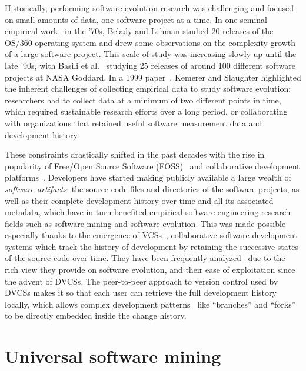 Historically, performing software evolution research was challenging and
focused on small amounts of data, one software project at a time. In one
seminal empirical work~\cite{belady1976model} in the '70s, Belady and Lehman
studied 20 releases of the OS/360 operating system and drew some observations
on the complexity growth of a large software project. This scale of study was
increasing slowly up until the late '90s, with Basili et
al.~\cite{basili1996understanding} studying 25 releases of around 100 different
software projects at NASA Goddard.  In a 1999
paper~\cite{kemerer1999empirical}, Kemerer and Slaughter highlighted the
inherent challenges of collecting empirical data to study software evolution:
researchers had to collect data at a minimum of two different points in time,
which required sustainable research efforts over a long period, or
collaborating with organizations that retained useful software measurement data
and development history.

These constraints drastically shifted in the past decades with the rise in
popularity of Free/Open Source Software
(FOSS)~\cite{syeed-2013-oss-evol-review} and collaborative development
platforms~\cite{dabbish2012socialcoding, kalliamvakou2014promises}. Developers
have started making publicly available a large wealth of \emph{software
artifacts}: the source code files and directories of the software projects, as
well as their complete development history over time and all its associated
metadata, which have in turn benefited empirical software engineering research
fields such as software mining and software evolution. This was made possible
especially thanks to the emergence of \glspl{VCS}~\cite{spinellis2005vcs},
collaborative software development systems which track the history of
development by retaining the successive states of the source code over time.
They have been frequently analyzed~\cite{kagdi2007msrsurvey} due to the rich
view they provide on software evolution, and their ease of exploitation since
the advent of \glspl{DVCS}. The peer-to-peer approach to version control used
by \glspl{DVCS} makes it so that each user can retrieve the full development
history locally, which allows complex development
patterns~\cite{gousios2014pullrequests,gousios2015work} like ``branches'' and
``forks'' to be directly embedded inside the change history.

\section{Universal software mining}
\label{sec:universal-software-mining}

